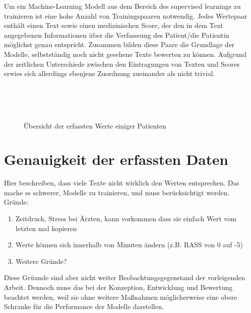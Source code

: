 Um ein Machine-Learning Modell aus dem Bereich des supervised learnings zu trainieren ist eine hohe Anzahl von Trainingspaaren notwendig. Jedes Wertepaar enthält einen Text sowie einen medizinischen Score, der den in dem Text angegebenen Informationen über die Verfasssung des Patient/die Patientin möglichst genau entspricht. Zusammen bilden diese Paare die Grundlage der Modelle, selbstständig noch nicht gesehene Texte bewerten zu können.
Aufgrund der zeitlichen Unterschiede zwischen den Eintragungen von Texten und Scores erwies sich allerdings ebenjene Zuordnung zueinander als nicht trivial.

\begin{figure}
    \centering
     \\
     \\
     \\
    \caption{Übersicht der erfassten Werte einiger Patienten}
    \label{fig:pat_example_scatterplots}
\end{figure}

\section{Genauigkeit der erfassten Daten}
Hier beschreiben, dass viele Texte nicht wirklich den Werten entsprechen. Das mache es schwerer, Modelle zu trainieren, und muss berücksichtigt werden. Gründe:
\begin{enumerate}
    \item Zeitdruck, Stress bei Ärzten, kann vorkommen dass sie einfach Wert vom letzten mal kopieren
    \item Werte können sich innerhalb von Minuten ändern (z.B. RASS von 0 auf -5)
    \item Weitere Gründe?
\end{enumerate}
Diese Grüunde sind aber nicht weiter Beobachtungsgegenstand der vorleigenden Arbeit. Dennoch muss das bei der Konzeption, Entwicklung und Bewertung beachtet werden, weil sie ohne weitere Maßnahmen möglicherweise eine obere Schranke für die Performance der Modelle darstellen.

